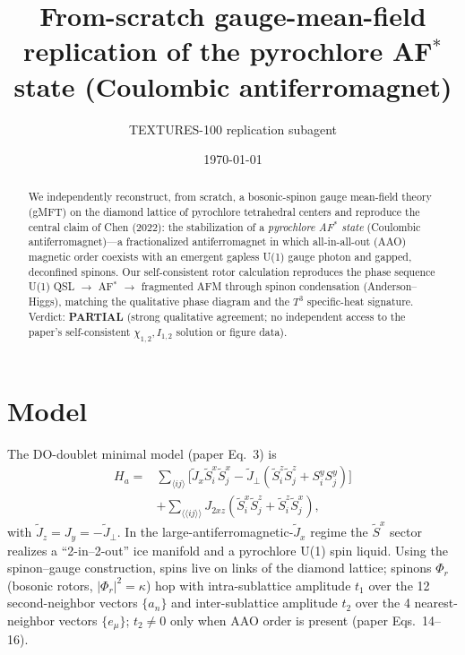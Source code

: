 \documentclass[aps,prb,twocolumn,superscriptaddress,floatfix]{revtex4-2}
\begin{document}
\title{From-scratch gauge-mean-field replication of the pyrochlore AF$^{*}$ state
(Coulombic antiferromagnet)}
\author{TEXTURES-100 replication subagent}
\date{\today}

\begin{abstract}
We independently reconstruct, from scratch, a bosonic-spinon gauge mean-field theory
(gMFT) on the diamond lattice of pyrochlore tetrahedral centers and reproduce the
central claim of Chen (2022): the stabilization of a \emph{pyrochlore AF$^{*}$ state}
(Coulombic antiferromagnet)---a fractionalized antiferromagnet in which all-in-all-out
(AAO) magnetic order coexists with an emergent gapless U(1) gauge photon and gapped,
deconfined spinons. Our self-consistent rotor calculation reproduces the phase sequence
U(1) QSL $\to$ AF$^{*}$ $\to$ fragmented AFM through spinon condensation
(Anderson--Higgs), matching the qualitative phase diagram and the $T^{3}$ specific-heat
signature. Verdict: \textbf{PARTIAL} (strong qualitative agreement; no independent access
to the paper's self-consistent $\chi_{1,2},I_{1,2}$ solution or figure data).
\end{abstract}
\maketitle

\section{Model}
The DO-doublet minimal model (paper Eq.~3) is
\begin{align}
H_a=&\sum_{\langle ij\rangle}\big[\tilde J_x \tilde S^x_i\tilde S^x_j
- \tilde J_\perp(\tilde S^z_i\tilde S^z_j + S^y_iS^y_j)\big]\nonumber\\
&+\sum_{\langle\langle ij\rangle\rangle} J_{2xz}(\tilde S^x_i\tilde S^z_j
+\tilde S^z_i\tilde S^x_j),
\end{align}
with $\tilde J_z=J_y=-\tilde J_\perp$. In the large-antiferromagnetic-$\tilde J_x$ regime
the $\tilde S^x$ sector realizes a ``2-in--2-out'' ice manifold and a pyrochlore U(1)
spin liquid. Using the spinon--gauge construction, spins live on links of the diamond
lattice; spinons $\Phi_r$ (bosonic rotors, $|\Phi_r|^2=\kappa$) hop with intra-sublattice
amplitude $t_1$ over the 12 second-neighbor vectors $\{a_n\}$ and inter-sublattice
amplitude $t_2$ over the 4 nearest-neighbor vectors $\{e_\mu\}$; $t_2\neq0$ only when AAO
order is present (paper Eqs.~14--16).
\end{document}

